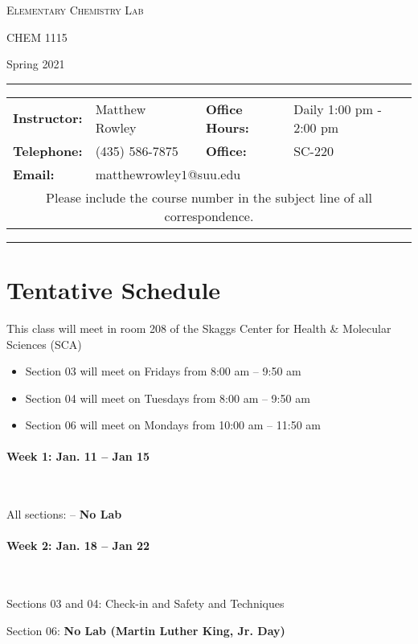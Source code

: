 \documentclass[12pt, letterpaper]{article}
\begin{document}
\begin{center}
	{\Large \textsc{Elementary Chemistry Lab}}
	
	CHEM 1115
\end{center}
\begin{center}
	{\large Spring 2021}
\end{center}
\begin{center}
	\rule{0.85\textwidth}{0.4pt}
	\begin{tabular}{llcll}
		\textbf{Instructor:} & Matthew Rowley & & \textbf{Office Hours:} & Daily 1:00 pm - 2:00 pm \\
		\textbf{Telephone:} & (435) 586-7875 & & \textbf{Office:} & SC-220 \\
		\textbf{Email:} & \multicolumn{3}{l}{matthewrowley$1$@suu.edu}\\
		\multicolumn{5}{c}{Please include the course number in the subject line of all correspondence.} 
	\end{tabular}
	\rule{0.85\textwidth}{0.4pt}
\end{center}

\section*{Tentative Schedule}
This class will meet in room 208 of the Skaggs Center for Health \& Molecular Sciences (SCA)
\begin{itemize}
	\item Section 03 will meet on Fridays from 8:00 am – 9:50 am
	\item Section 04 will meet on Tuesdays from 8:00 am – 9:50 am
	\item Section 06 will meet on Mondays from 10:00 am – 11:50 am
\end{itemize}

\paragraph*{Week 1: Jan. 11 -- Jan 15}~

All sections: -- \textbf{No Lab}

\paragraph{Week 2: Jan. 18 -- Jan 22}~ 

Sections 03 and 04: Check-in and Safety and Techniques

Section 06: \textbf{No Lab (Martin Luther King, Jr. Day)}
\end{document}

